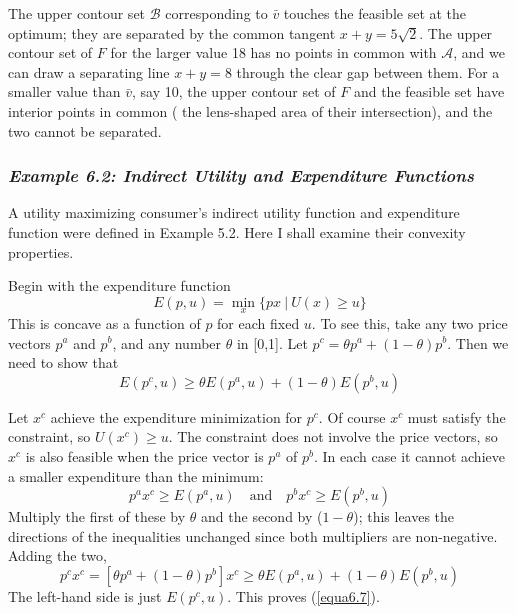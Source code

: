 The upper contour set $\mathcal{B}$ corresponding to $\bar{v}$ touches the feasible set at the optimum; they are separated by the common tangent $x+y=5 \sqrt{2}$. The upper contour set of $F$ for the larger value 18 has no points in common with $\mathcal{A}$, and we can draw a separating line $x+y=8$ through the clear gap between them. For a smaller value than $\bar{v}$, say 10, the upper contour set of $F$ and the feasible set have interior points in common ( the lens-shaped area of their intersection), and the two cannot be separated.

\subsubsection*{\textit{Example 6.2: Indirect Utility and Expenditure Functions}}

A utility maximizing consumer's indirect utility function and expenditure function were defined in Example 5.2. Here I shall examine their convexity properties.

Begin with the expenditure function
\begin{equation} \label{equa6.6}
E(p,u) = \min\limits_x \{  px \ | \  U(x) \geq u  \}
\end{equation}
This is concave as a function of $p$ for each fixed $u$. To see this, take any two price vectors $p^a$ and $p^b$, and any number $\theta$ in [0,1]. Let $p^c = \theta p^a + (1-\theta)p^b$. Then we need to show that
\begin{equation} \label{equa6.7}
E(p^c,u) \geq  \theta E(p^a, u) + (1-\theta) E(p^b,u)
\end{equation}

Let $x^c$ achieve the expenditure minimization for $p^c$. Of course $x^c$ must satisfy the constraint, so $U(x^c) \geq u$. The constraint does not involve the price vectors, so $x^c$ is also feasible when the price vector is $p^a$ of $p^b$. In each case it cannot achieve a smaller expenditure than the minimum:
\begin{equation} \label{equa6.8}
p^a x^c \geq E(p^a, u) \quad \mbox{and} \quad p^b x^c \geq E(p^b, u) 
\end{equation}
Multiply the first of these by $\theta$ and the second by ($1-\theta$); this leaves the directions of the inequalities unchanged since both multipliers are non-negative. Adding the two,
\begin{equation*}  
p^c x^c = [ \theta p^a + (1-\theta)p^b ]  x^c \geq \theta E(p^a, u) + (1-\theta)  E(p^b, u)
\end{equation*}
The left-hand side is just $E(p^c, u)$. This proves (\ref{equa6.7}).

